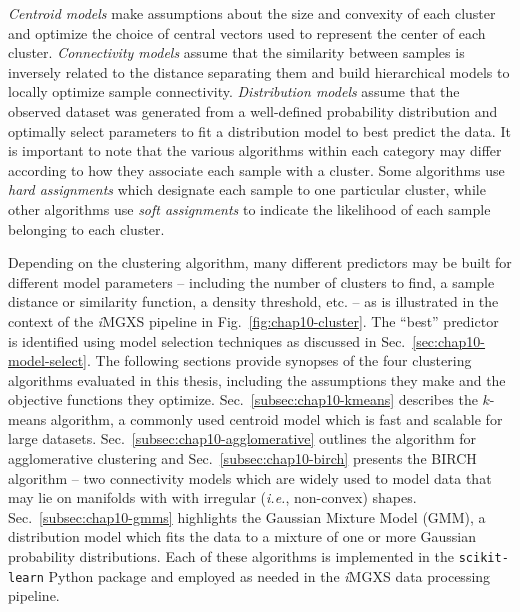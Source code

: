 \noindent \textit{Centroid models} make assumptions about the size and convexity of each cluster and optimize the choice of central vectors used to represent the center of each cluster. \textit{Connectivity models} assume that the similarity between samples is inversely related to the distance separating them and build hierarchical models to locally optimize sample connectivity. \textit{Distribution models} assume that the observed dataset was generated from a well-defined probability distribution and optimally select parameters to fit a distribution model to best predict the data. It is important to note that the various algorithms within each category may differ according to how they associate each sample with a cluster. Some algorithms use \textit{hard assignments} which designate each sample to one particular cluster, while other algorithms use \textit{soft assignments} to indicate the likelihood of each sample belonging to each cluster.

Depending on the clustering algorithm, many different predictors may be built for different model parameters -- including the number of clusters to find, a sample distance or similarity function, a density threshold, etc. -- as is illustrated in the context of the \textit{i}\ac{MGXS} pipeline in Fig.~\ref{fig:chap10-cluster}. The ``best'' predictor is identified using model selection techniques as discussed in Sec.~\ref{sec:chap10-model-select}. The following sections provide synopses of the four clustering algorithms evaluated in this thesis, including the assumptions they make and the objective functions they optimize. Sec.~\ref{subsec:chap10-kmeans} describes the $k$-means algorithm, a commonly used centroid model which is fast and scalable for large datasets. Sec.~\ref{subsec:chap10-agglomerative} outlines the algorithm for agglomerative clustering and Sec.~\ref{subsec:chap10-birch} presents the BIRCH algorithm -- two connectivity models which are widely used to model data that may lie on manifolds with with irregular (\textit{i.e.}, non-convex) shapes. Sec.~\ref{subsec:chap10-gmms} highlights the Gaussian Mixture Model (GMM), a distribution model which fits the data to a mixture of one or more Gaussian probability distributions. Each of these algorithms is implemented in the \texttt{scikit-learn} Python package and employed as needed in the \textit{i}\ac{MGXS} data processing pipeline.

